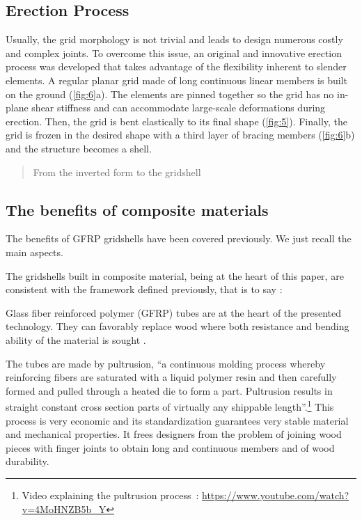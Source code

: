 \subsection{Erection Process}
Usually, the grid morphology is not trivial and leads to design numerous costly and complex joints. To overcome this issue, an original and innovative erection process was developed that takes advantage of the flexibility inherent to slender elements. A regular planar grid made of long continuous linear members is built on the ground (\autoref{fig:6}a). The elements are pinned together so the grid has no in-plane shear stiffness and can accommodate large-scale deformations during erection. Then, the grid is bent elastically to its final shape (\autoref{fig:5}). Finally, the grid is frozen in the desired shape with a third layer of bracing members (\autoref{fig:6}b) and the structure becomes a shell.

\blockcquote[][p.~179]{IL10}{From the inverted form to the gridshell}

\subsection{The benefits of composite materials}

The benefits of GFRP gridshells have been covered previously. We just recall the main aspects.

The gridshells built in composite material, being at the heart of this paper, are consistent with the framework defined previously, that is to say :


Glass fiber reinforced polymer (GFRP) tubes are at the heart of the presented technology. They can favorably replace wood where both resistance and bending ability of the material is sought \cite{Douthe2010}. 

The tubes are made by pultrusion, \enquote{a continuous molding process whereby reinforcing fibers are saturated with a liquid polymer resin and then carefully formed and pulled through a heated die to form a part. Pultrusion results in straight constant cross section parts of virtually any shippable length}.\footnote{Video explaining the pultrusion process~: \url{https://www.youtube.com/watch?v=4MoHNZB5b_Y}} This process is very economic and its standardization guarantees very stable material and mechanical properties. It frees designers from the problem of joining wood pieces with finger joints to obtain long and continuous members and of wood durability. 


